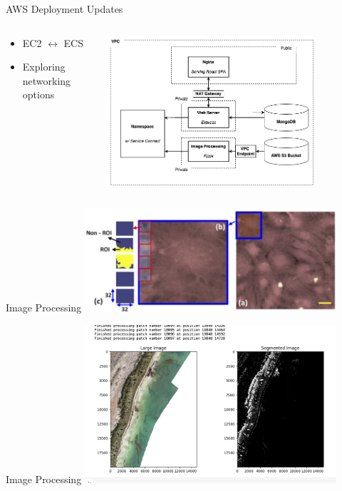 \begin{frame}{AWS Deployment Updates}
    \begin{columns}
        \begin{column}{0.3\textwidth}
            \begin{itemize}
                \item EC2 $\leftrightarrow$ ECS
                \item Exploring networking options
            \end{itemize}  
        \end{column}
        \begin{column}{0.7\textwidth}
            \centering
            \includegraphics[height=0.8\textheight,width=0.8\textwidth,keepaspectratio]{images/mm_system_2.png}
        \end{column}
    \end{columns}
\end{frame}

\begin{frame}{Image Processing}
    \centering
    \includegraphics[height=0.7\textheight,width=0.7\textwidth,keepaspectratio]{images/mm_sliding_and_patching.png}
\end{frame}

\begin{frame}{Image Processing}
    \centering
    \includegraphics[height=0.7\textheight,width=0.7\textwidth,keepaspectratio]{images/mm_drone2.png}
\end{frame}

